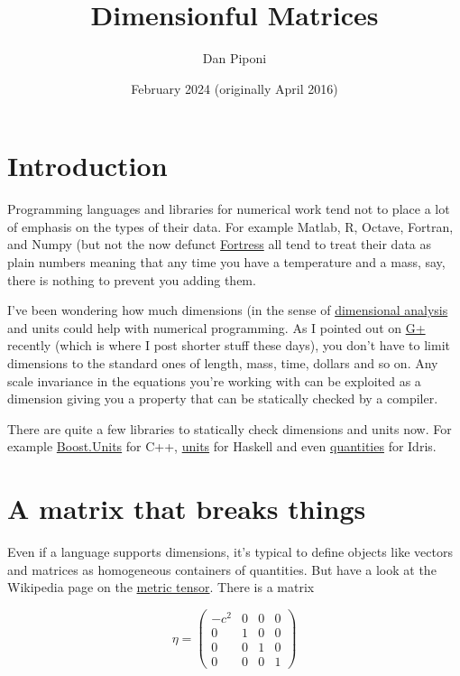 \documentclass[12pt]{article}
\title{Dimensionful Matrices}
\author{Dan Piponi}
\date{February 2024 (originally April 2016)}
\begin{document}
\maketitle

\section{Introduction}
Programming languages and libraries for numerical work tend not to place a lot of emphasis on the types of their data.
For example Matlab, R, Octave, Fortran, and Numpy (but not the now defunct \href{https://projectfortress.java.net)}{Fortress} all tend to treat their data as plain numbers meaning that any time you have a temperature and a mass, say, there is nothing to prevent you adding them.

I've been wondering how much dimensions (in the sense of \href{https://en.wikipedia.org/wiki/Dimensional_analysis}{dimensional analysis} and units could help with numerical programming.
As I pointed out on \href{https://plus.google.com/+DanPiponi/posts/VNkdwwJL4LM}{G+} recently (which is where I post shorter stuff these days), you don't have to limit dimensions to the standard ones of length, mass, time, dollars and so on.
Any scale invariance in the equations you're working with can be exploited as a dimension giving you a property that can be statically checked by a compiler.

There are quite a few libraries to statically check dimensions and units now. For example \href{http://www.boost.org/doc/libs/1_61_0/doc/html/boost_units.html}{Boost.Units} for C++, \href{https://hackage.haskell.org/package/units}{units} for Haskell and even \href{https://github.com/timjb/quantities}{quantities} for Idris.

\section{A matrix that breaks things}
Even if a language supports dimensions, it's typical to define objects like vectors and matrices as homogeneous containers of quantities.
But have a look at the Wikipedia page on the \href{https://en.wikipedia.org/wiki/Metric_tensor_%28general_relativity%29}{metric tensor}.
There is a matrix

$$\eta=\begin{pmatrix}-c^2&0&0&0\\0&1&0&0\\0&0&1&0\\0&0&0&1\end{pmatrix}$$
\end{document}
